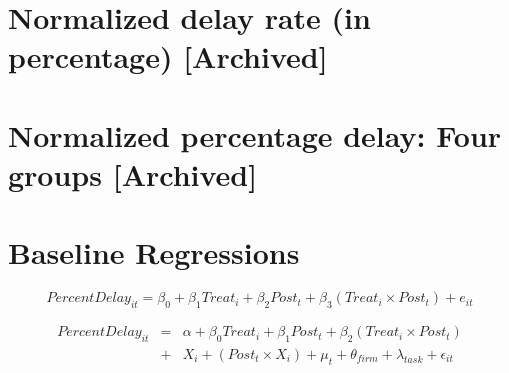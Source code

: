 \documentclass[
]{article}
\begin{document}
\hypertarget{normalized-delay-rate-in-percentage-archived}{%
\section{Normalized delay rate (in percentage)
{[}Archived{]}}\label{normalized-delay-rate-in-percentage-archived}}

\hypertarget{normalized-percentage-delay-four-groups-archived}{%
\section{Normalized percentage delay: Four groups
{[}Archived{]}}\label{normalized-percentage-delay-four-groups-archived}}

\hypertarget{baseline-regressions}{%
\section{Baseline Regressions}\label{baseline-regressions}}

\[ PercentDelay_{it} = \beta_0 + \beta_1 Treat_i + \beta_2 Post_t + \beta_3 (Treat_i \times Post_t) + e_{it}\]

\[ \begin{aligned} PercentDelay_{it} &=& \alpha+\beta_0 Treat_i + \beta_1 Post_t + \beta_2 (Treat_i \times Post_t)\\
&+&  X_i + (Post_t \times X_i) + \mu_t + \theta_{firm} + \lambda_{task}+ \epsilon_{it}
\end{aligned}\]
\end{document}
